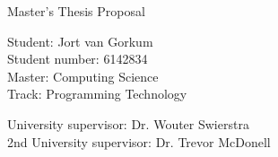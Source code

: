 \begin{titlepage}
  \fontsize{12pt}{15pt}\selectfont
  \begin{center}
    \vspace*{4cm}

    Master's Thesis Proposal

    {
      \parbox[]{10cm} {
        \centering
        \maketitle
      }
    }
      
    \vspace{1.25cm}
    
    Student: Jort van Gorkum\\
    Student number: 6142834\\
    Master: Computing Science\\
    Track: Programming Technology
    
    \vspace{1.25cm}
    
    University supervisor: Dr. Wouter Swierstra\\
    2nd University supervisor: Dr. Trevor McDonell\\
    
    \vspace{1cm}

  \end{center}
\end{titlepage}